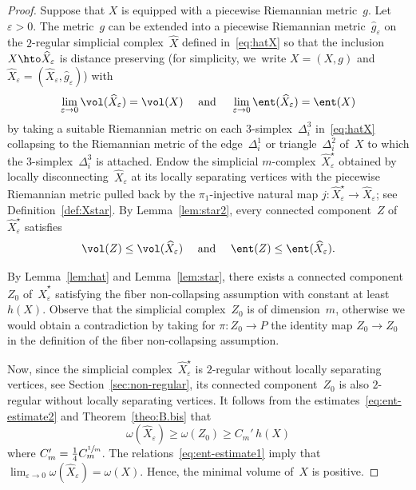 \begin{proof}
Suppose that $X$ is equipped with a piecewise Riemannian metric~$g$.
Let $\varepsilon>0$.
The metric~$g$ can be extended into a piecewise Riemannian metric~$\hat{g}_\varepsilon$ on the $2$-regular simplicial complex~$\widehat{X}$ defined in~\eqref{eq:hatX} so that the inclusion~$X \hto \widehat{X}_\varepsilon$ is distance preserving (for simplicity, we~write $X=(X,g)$ and $\widehat{X}_\varepsilon=(\widehat{X}_\varepsilon,\hat{g}_\varepsilon)$) with
\begin{equation} \label{eq:ent-estimate1}
\lim_{\varepsilon \to 0} \vol(\widehat{X}_\varepsilon) = \vol(X) \quad \text{ and } \quad \lim_{\varepsilon \to 0} \ent(\widehat{X}_\varepsilon) = \ent(X)
\end{equation}
by taking a suitable Riemannian metric on each $3$-simplex~$\Delta_i^3$ in~\eqref{eq:hatX} collapsing to the Riemannian metric of the edge~$\Delta_i^1$ or triangle~$\Delta_i^2$ of~$X$ to which the $3$-simplex~$\Delta_i^3$ is attached.
Endow the simplicial $m$\nobreakdash-complex~$\widehat{X}^\star_\varepsilon$ obtained by locally disconnecting~$\widehat{X}_\varepsilon$ at its locally separating vertices with the piecewise Riemannian metric pulled back by the $\pi_1$-injective natural map $j:\widehat{X}^\star_\varepsilon \to \widehat{X}_\varepsilon$; see Definition~\ref{def:Xstar}.
By Lemma~\ref{lem:star2}, every connected component~$Z$ of~$\widehat{X}^\star_\varepsilon$ satisfies
\begin{equation} \label{eq:ent-estimate2}
\vol(Z) \leq \vol(\widehat{X}_\varepsilon) \quad \text{ and } \quad \ent(Z) \leq \ent(\widehat{X}_\varepsilon).
\end{equation}

By Lemma~\ref{lem:hat} and Lemma~\ref{lem:star}, there exists a connected component~$Z_0$ of~$\widehat{X}^\star_\varepsilon$ satisfying the fiber non-collapsing assumption with constant at least~$h(X)$.
Observe that the simplicial complex~$Z_0$ is of dimension~$m$, otherwise we would obtain a contradiction by taking for \mbox{$\pi:Z_0 \to P$} the identity map $Z_0 \to Z_0$ in the definition of the fiber non-collapsing assumption.

Now, since the simplicial complex~$\widehat{X}^\star_\varepsilon$ is $2$-regular without locally separating vertices, see Section~\ref{sec:non-regular}, its connected component~$Z_0$ is also $2$-regular without locally separating vertices.
It follows from the estimates~\eqref{eq:ent-estimate2} and Theorem~\ref{theo:B.bis} that
\[
\omega(\widehat{X}_\varepsilon) \geq \omega(Z_0) \geq C_m' \, h(X)
\]
where $C_m'=\frac{1}{4} C_m^{\sfrac{1}{m}}$.
The relations~\eqref{eq:ent-estimate1} imply that $\lim_{\varepsilon \to 0} \omega(\widehat{X}_\varepsilon) = \omega(X)$.
Hence, the minimal volume of~$X$ is positive.
\end{proof}

